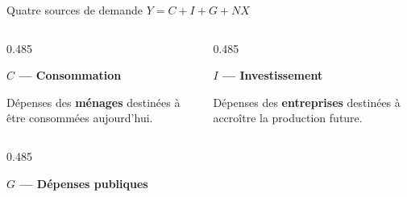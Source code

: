 \documentclass[aspectratio=169]{beamer}
\begin{document}
\begin{frame}{Quatre sources de demande}
   \centering
   {\Large $Y = C + I + G + NX$}\par\vspace{0.25cm}
   \begin{columns}[T,onlytextwidth]
      \begin{column}{0.485\textwidth}
         \begin{tcolorbox}[colback=HEClightgray, colframe=HEClightgray, boxrule=0pt, arc=8pt, height=1.85cm, left=8pt, right=8pt, top=6pt, bottom=6pt]
            \RaggedRight
            \textbf{\textcolor{HECnavy}{$C$ — Consommation}}\par\vspace{3pt}
            \footnotesize Dépenses des \textbf{ménages} destinées à être consommées aujourd'hui.
         \end{tcolorbox}
      \end{column}
      \begin{column}{0.485\textwidth}
         \begin{tcolorbox}[colback=HEClightgray, colframe=HEClightgray, boxrule=0pt, arc=8pt, height=1.85cm, left=8pt, right=8pt, top=6pt, bottom=6pt]
            \RaggedRight
            \textbf{\textcolor{HECnavy}{$I$ — Investissement}}\par\vspace{3pt}
            \footnotesize Dépenses des \textbf{entreprises} destinées à accroître la production future.
         \end{tcolorbox}
      \end{column}
   \end{columns}
   \vspace{0.1cm}
   \begin{columns}[T,onlytextwidth]
      \begin{column}{0.485\textwidth}
         \begin{tcolorbox}[colback=HEClightgray, colframe=HEClightgray, boxrule=0pt, arc=8pt, height=1.85cm, left=8pt, right=8pt, top=6pt, bottom=6pt]
            \RaggedRight
            \textbf{\textcolor{HECnavy}{$G$ — Dépenses publiques}}\par\vspace{3pt}

\end{tcolorbox}
\end{column}
\end{columns}
\end{frame}
\end{document}
